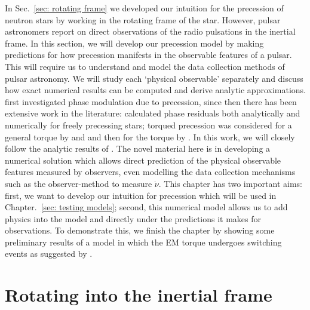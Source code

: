 \documentclass[../full_thesis/full_thesis.tex]{subfiles}
\begin{document}
In Sec.~\ref{sec: rotating frame} we developed our intuition for the precession
of neutron stars by working in the rotating frame of the star. However, pulsar
astronomers report on direct observations of the radio pulsations in the
inertial frame. In this section, we will develop our precession model by making
predictions for how precession manifests in the observable features of a
pulsar. This will require us to understand and model the data collection
methods of pulsar astronomy. We will study each `physical observable'
separately and discuss how exact numerical results can be computed and derive
analytic approximations. \citet{Ruderman1970} first investigated phase modulation
due to precession, since then there has been extensive work in the literature:
\citet{Nelson1990} calculated phase residuals both analytically
and numerically for freely precessing stars; torqued precession was considered
for a general torque by \citet{Jones1988excitation} and \citet{Cordes1993} and
then for the \citet{Deutsch1955} torque by \citet{Melatos1999, Melatos2000}. In this work,
we will closely follow the analytic results of \citet{Jones2001}. The novel
material here is in developing a numerical solution which allows direct
prediction of the physical observable features measured by observers, even
modelling the data collection mechanisms such as the observer-method to measure
$\dot{\nu}$. This chapter has two important aims: first, we want to develop our
intuition for precession which will be used in Chapter.~\ref{sec: testing
models}; second, this numerical model allows us to add physics into the model and
directly under the predictions it makes for observations. To demonstrate this,
we finish the chapter by showing some preliminary results of a model in which
the EM torque undergoes switching events as suggested by \citet{Lyne2010}.

\section{Rotating into the inertial frame}
\end{document}
